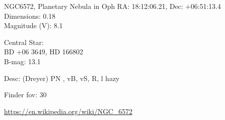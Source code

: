 \begin{block}{NGC6572, Planetary Nebula in Oph}
    RA: 18:12:06.21, Dec: +06:51:13.4 \\ 
    Dimensions: 0.18 \\ 
    Magnitude (V): 8.1

    Central Star: \\ 
      \hspace{1em}BD +06 3649, HD 166802 \\ 
      \hspace{1em}B-mag: 13.1 

    Desc: (Dreyer) PN , vB, vS, R, l hazy 

    Finder fov: 30 

    \url{https://en.wikipedia.org/wiki/NGC_6572} 
\end{block}